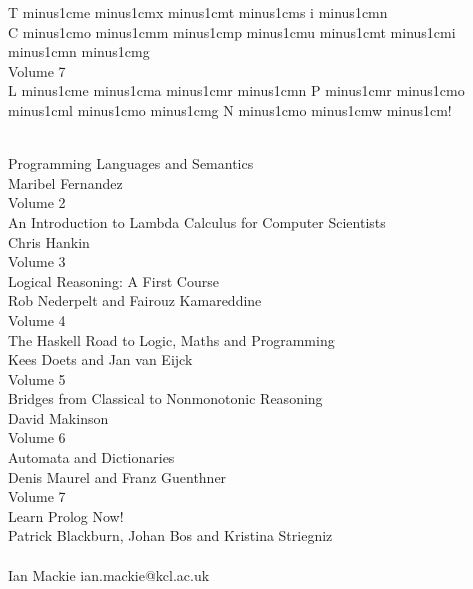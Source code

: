 
\thispagestyle{empty}
\def\sqz{\hskip0pt minus1cm}
\vspace*{2cm}

\begin{center}
{\jlctitleA T\sqz e\sqz x\sqz t\sqz s i\sqz n}\\[3ex]
{\jlctitleA C\sqz o\sqz m\sqz p\sqz u\sqz t\sqz i\sqz n\sqz g}\\[3ex]
{\jlctitleB Volume 7}\\[18ex]

{\jlctitleC L\sqz e\sqz a\sqz r\sqz n P\sqz r\sqz o\sqz l\sqz o\sqz g N\sqz o\sqz w\sqz !}

\end{center}
\newpage\thispagestyle{empty}
\newpage\thispagestyle{empty}

\mbox{}
\vfill

\\
{\sf Programming Languages and Semantics}\\
{\sf Maribel Fernandez}\\[1ex]
 {\sf Volume 2}\\
 {\sf An Introduction to Lambda Calculus for Computer Scientists}\\
 {\sf Chris Hankin}\\[1ex]
 {\sf Volume 3}\\
{\sf Logical Reasoning: A First Course}\\
{\sf Rob Nederpelt and Fairouz Kamareddine}\\[1ex]
 {\sf Volume 4}\\
{\sf The Haskell Road to Logic, Maths and Programming}\\
{\sf Kees Doets and Jan van Eijck}\\[1ex]
{\sf Volume 5}\\
{\sf Bridges from Classical to Nonmonotonic Reasoning}\\
{\sf  David Makinson}\\[1ex]
{\sf Volume 6}\\
{\sf Automata and Dictionaries}\\
{\sf  Denis Maurel and Franz Guenthner}\\[1ex]
{\sf Volume 7}\\
{\sf Learn Prolog Now!}\\
{\sf  Patrick Blackburn, Johan Bos and Kristina Striegniz}\\[1ex]

  \\
 {\sf Ian Mackie  \hfill  ian.mackie@kcl.ac.uk}\\

